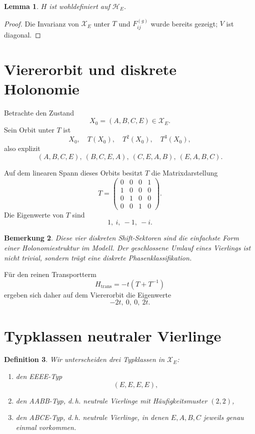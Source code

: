 \documentclass[11pt,a4paper]{article}
\newtheorem{definition}{Definition}[section]
\newtheorem{lemma}[definition]{Lemma}
\newtheorem{remark}[definition]{Bemerkung}
\newcommand{\XE}{\mathcal X_E}
\newcommand{\HE}{\mathcal H_E}
\begin{document}
	\begin{lemma}
		\(H\) ist wohldefiniert auf \(\HE\).
	\end{lemma}
	
	\begin{proof}
		Die Invarianz von \(\XE\) unter \(T\) und \(F_{ij}^{(g)}\) wurde bereits gezeigt; \(V\) ist diagonal.
	\end{proof}
	
	\section{Viererorbit und diskrete Holonomie}
	
	Betrachte den Zustand
	\[
	X_0=(A,B,C,E)\in\XE.
	\]
	Sein Orbit unter \(T\) ist
	\[
	X_0,\quad T(X_0),\quad T^2(X_0),\quad T^3(X_0),
	\]
	also explizit
	\[
	(A,B,C,E),\ (B,C,E,A),\ (C,E,A,B),\ (E,A,B,C).
	\]
	
	Auf dem linearen Spann dieses Orbits besitzt \(T\) die Matrixdarstellung
	\[
	T=
	\begin{pmatrix}
		0&0&0&1\\
		1&0&0&0\\
		0&1&0&0\\
		0&0&1&0
	\end{pmatrix}.
	\]
	Die Eigenwerte von \(T\) sind
	\[
	1,\ i,\ -1,\ -i.
	\]
	
	\begin{remark}
		Diese vier diskreten Shift-Sektoren sind die einfachste Form einer Holonomiestruktur im Modell. Der geschlossene Umlauf eines Vierlings ist nicht trivial, sondern trägt eine diskrete Phasenklassifikation.
	\end{remark}
	
	Für den reinen Transportterm
	\[
	H_{\mathrm{trans}}=-t(T+T^{-1})
	\]
	ergeben sich daher auf dem Viererorbit die Eigenwerte
	\[
	-2t,\ 0,\ 0,\ 2t.
	\]
	
	\section{Typklassen neutraler Vierlinge}
	
	\begin{definition}
		Wir unterscheiden drei Typklassen in \(\XE\):
		\begin{enumerate}[label=(\alph*)]
			\item den \emph{EEEE-Typ}
			\[
			(E,E,E,E),
			\]
			\item den \emph{AABB-Typ}, d.\,h. neutrale Vierlinge mit Häufigkeitsmuster \((2,2)\),
			\item den \emph{ABCE-Typ}, d.\,h. neutrale Vierlinge, in denen \(E,A,B,C\) jeweils genau einmal vorkommen.
		\end{enumerate}
	\end{definition}
	
\end{document}
